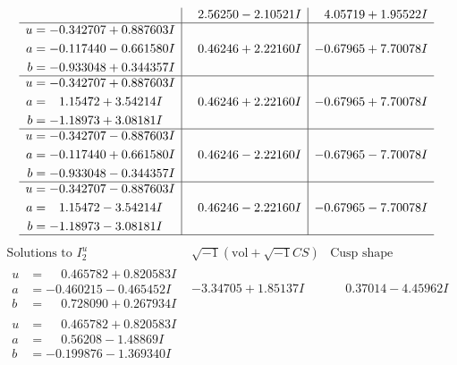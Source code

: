 \documentclass[1p]{elsarticle_modified}
\theoremstyle{definition}
\newcommand{\I}{\sqrt{-1}}
\begin{document}
$$\begin{array}{c|c|c}
 & \phantom{-}2.56250 - 2.10521 I & \phantom{-}4.05719 + 1.95522 I \\ \hline\begin{aligned}
u &= -0.342707 + 0.887603 I \\
a &= -0.117440 - 0.661580 I \\
b &= -0.933048 + 0.344357 I\end{aligned}
 & \phantom{-}0.46246 + 2.22160 I & -0.67965 + 7.70078 I \\ \hline\begin{aligned}
u &= -0.342707 + 0.887603 I \\
a &= \phantom{-}1.15472 + 3.54214 I \\
b &= -1.18973 + 3.08181 I\end{aligned}
 & \phantom{-}0.46246 + 2.22160 I & -0.67965 + 7.70078 I \\ \hline\begin{aligned}
u &= -0.342707 - 0.887603 I \\
a &= -0.117440 + 0.661580 I \\
b &= -0.933048 - 0.344357 I\end{aligned}
 & \phantom{-}0.46246 - 2.22160 I & -0.67965 - 7.70078 I \\ \hline\begin{aligned}
u &= -0.342707 - 0.887603 I \\
a &= \phantom{-}1.15472 - 3.54214 I \\
b &= -1.18973 - 3.08181 I\end{aligned}
 & \phantom{-}0.46246 - 2.22160 I & -0.67965 - 7.70078 I\\
 \hline 
 \end{array}$$\newpage$$\begin{array}{c|c|c}  
\text{Solutions to }I^u_{2}& \I (\text{vol} + \sqrt{-1}CS) & \text{Cusp shape}\\
 \hline 
\begin{aligned}
u &= \phantom{-}0.465782 + 0.820583 I \\
a &= -0.460215 - 0.465452 I \\
b &= \phantom{-}0.728090 + 0.267934 I\end{aligned}
 & -3.34705 + 1.85137 I & \phantom{-}0.37014 - 4.45962 I \\ \hline\begin{aligned}
u &= \phantom{-}0.465782 + 0.820583 I \\
a &= \phantom{-}0.56208 - 1.48869 I \\
b &= -0.199876 - 1.369340 I\end{aligned}

\end{array}$$
\end{document}
